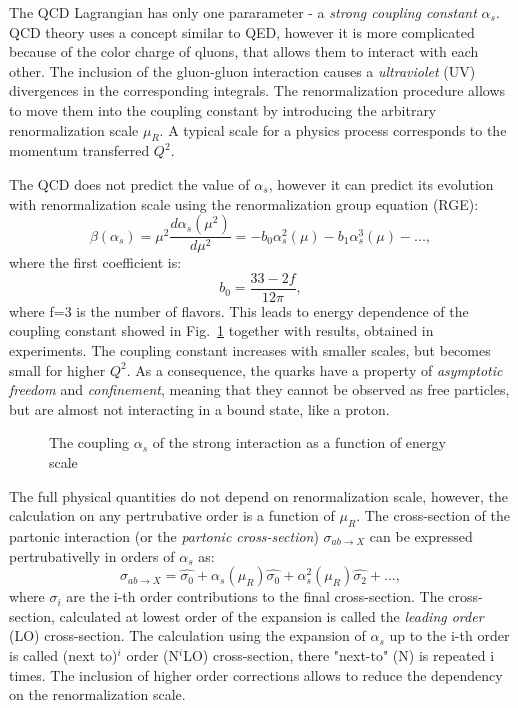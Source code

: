The QCD Lagrangian has only one pararameter - a \textit{strong coupling constant} $\alpha_s$. QCD theory uses a concept  similar to QED, however it is more complicated because of the color charge of qluons, that allows them to interact with each other. The inclusion of the gluon-gluon interaction causes a  \textit{ultraviolet} (UV) divergences in the corresponding integrals. The renormalization procedure\cite{Renorm} allows to move them into the coupling constant by introducing the arbitrary renormalization scale $\mu_R$. A typical scale for a physics process corresponds to the momentum transferred $Q^2$. 

The QCD does not predict the value of $\alpha_s$, however it can predict its evolution with renormalization scale using the renormalization group equation (RGE):
\begin{equation}
\beta(\alpha_s) = \mu^2 \frac{d\alpha_s(\mu^2)}{d\mu^2}= - b_0 \alpha_s^2(\mu) - b_1 \alpha_s^3(\mu)-..., 
\end{equation}
where the first coefficient is:
\begin{equation}
b_0 = \frac{33-2f}{12\pi},
\end{equation}
where f=3 is the number of flavors. This leads to energy dependence of the coupling constant showed in Fig.~\ref{fig:SMAlphaS} together with results, obtained in experiments. The coupling constant increases with smaller scales, but becomes small for higher $Q^2$. As a consequence, the quarks have a property of \textit{asymptotic freedom} and \textit{confinement}, meaning that they cannot be observed as free particles, but are almost not interacting in a bound state, like a proton.

\begin{figure}[!tbp]
\caption{The coupling $\alpha_s$ of the strong interaction as a function of energy scale \cite{alphaS}}
\label{fig:SMAlphaS}
\end{figure}


The full physical quantities do not depend on renormalization scale, however, the calculation on any pertrubative order is a function of $\mu_R$. The cross-section of the partonic interaction (or the \textit{partonic cross-section}) $\sigma_{ab\to X}$ can be expressed pertrubativelly in orders of $\alpha_s$ as:
\begin{equation}
\sigma_{ab\to X}=\hat{\sigma_0}+\alpha_{s}(\mu_R)\hat{\sigma_0}+\alpha^2_{s}(\mu_R)\hat{\sigma_2}+..., 
\end{equation}
where $\sigma_i$ are the i-th order contributions to the final cross-section. The cross-section, calculated at lowest order of the expansion is called the \textit{leading order} (LO) cross-section. The calculation using the expansion of $\alpha_s$ up to the i-th order is called (next to)$^i$ order (N$^i$LO) cross-section, there "next-to" (N) is repeated i times. The inclusion of higher order corrections allows to reduce the dependency on the renormalization scale. 


